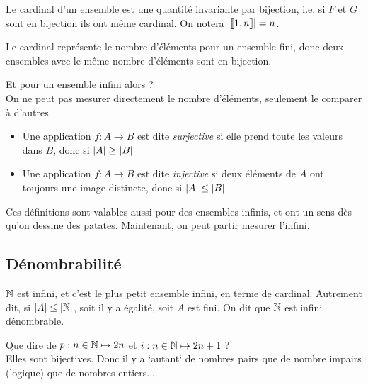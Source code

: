 \documentclass{cours}
\begin{document}
    \begin{definition}
        Le cardinal d'un ensemble est une quantité invariante par bijection, i.e. si $F$ et $G$ sont en bijection ils ont même cardinal. On notera $\left|\llbracket 1, n \rrbracket\right| = n$.
    \end{definition}

    \begin{remark}
        Le cardinal représente le nombre d'éléments pour un ensemble fini, donc deux ensembles avec le même nombre d'éléments sont en bijection.
    \end{remark}
    
    Et pour un ensemble infini alors ? \\
    On ne peut pas mesurer directement le nombre d'éléments, seulement le comparer à d'autres        
    
    \begin{definition}
        \begin{itemize}
            \item Une application $f : A \rightarrow B$ est dite \emph{surjective} si elle prend toute les valeurs dans $B$, donc si $\left|A\right| \geq \left|B\right|$
            \item Une application $f : A \rightarrow B$ est dite \emph{injective} si deux éléments de $A$ ont toujours une image distincte, donc si $\left|A\right| \leq \left|B\right|$
        \end{itemize}       
    \end{definition}

    \begin{remark}
        Ces définitions sont valables aussi pour des ensembles infinis, et ont un sens dès qu'on dessine des patates. Maintenant, on peut partir mesurer l'infini.
    \end{remark}

    \subsection{Dénombrabilité}
    \begin{proposition}
        $\mathbb{N}$ est infini, et c'est le plus petit ensemble infini, en terme de cardinal. Autrement dit, si $\left|A\right| \leq \left|\mathbb{N}\right|$, soit il y a égalité, soit $A$ est fini. On dit que $\mathbb{N}$ est infini dénombrable.
    \end{proposition}
    
    \begin{remark}
        Que dire de $p : n \in \mathbb{N} \mapsto 2n$ et $i : n \in \mathbb{N} \mapsto 2n + 1$ ? \\
        Elles sont bijectives. Donc il y a `autant` de nombres pairs que de nombre impairs (logique) que de nombres entiers...
    \end{remark}
\end{document}
